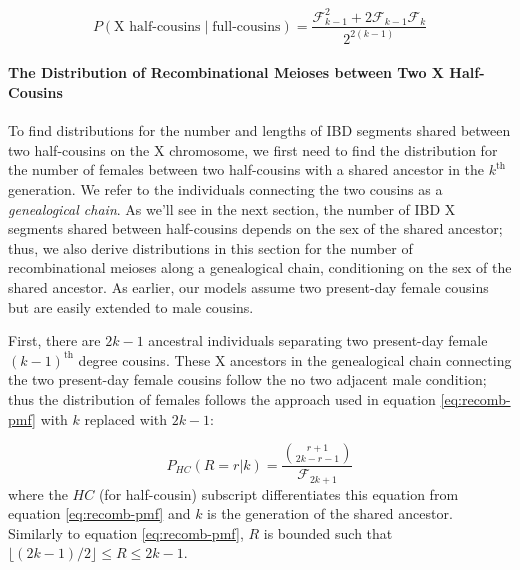 \documentclass[9pt,twocolumn,twoside]{gsajnl}
\begin{document}
\begin{equation}
  P(\text{X half-cousins} \;|\; \text{full-cousins}) = \frac{\mathcal{F}_{k-1}^2 + 2 \mathcal{F}_{k-1} \mathcal{F}_k}{2^{2(k-1)}}
\end{equation}

\paragraph{The Distribution of Recombinational Meioses between Two X Half-Cousins}
\label{p:two-cousins-rms}

To find distributions for the number and lengths of IBD segments shared between
two half-cousins on the X chromosome, we first need to find the distribution
for the number of females between two half-cousins with a shared ancestor in
the $k^\text{th}$ generation. We refer to the individuals connecting the two
cousins as a \emph{genealogical chain}. As we'll see in the next section, the
number of IBD X segments shared between half-cousins depends on the sex of the
shared ancestor; thus, we also derive distributions in this section for the
number of recombinational meioses along a genealogical chain, conditioning on
the sex of the shared ancestor. As earlier, our models assume two present-day
female cousins but are easily extended to male cousins.

First, there are $2k-1$ ancestral individuals separating two present-day female
$(k-1)^\text{th}$ degree cousins. These X ancestors in the genealogical chain
connecting the two present-day female cousins follow the no two adjacent male
condition; thus the distribution of females follows the approach used in
equation \eqref{eq:recomb-pmf} with $k$ replaced with $2k-1$:

\begin{equation}
  \label{eq:recomb-sanc-pmf}
  P_{HC}(R=r | k) = \frac{ {r+1 \choose 2k-r-1} }{\mathcal{F}_{2k+1}}
\end{equation}
%
where the $HC$ (for half-cousin) subscript differentiates this equation from
equation \eqref{eq:recomb-pmf} and $k$ is the generation of the shared
ancestor. Similarly to equation \eqref{eq:recomb-pmf}, $R$ is bounded such that
$\lfloor (2k - 1)/2 \rfloor \le R \le 2k - 1$.
\end{document}
